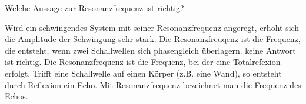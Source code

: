 \documentclass[11pt]{exam}
\begin{document}
\begin{questions}
\vspace{3mm}\question Welche Aussage zur Resonanzfrequenz ist richtig?

\begin{choices}
	\choice Wird ein schwingendes System mit seiner Resonanzfrequenz angeregt, erhöht sich die Amplitude der Schwingung sehr stark.
	\choice Die Resonanzfreuqenz ist die Frequenz, die entsteht, wenn zwei Schallwellen sich phasengleich überlagern.
	\choice keine Antwort ist richtig.
	\choice Die Resonanzfrequenz ist die Frequenz, bei der eine Totalrefexion erfolgt.
	\choice Trifft eine Schallwelle auf einen Körper (z.B. eine Wand), so entsteht durch Reflexion ein Echo. Mit Resonanzfrequenz bezeichnet man die Frequenz des Echos.
\end{choices}

\vspace{3mm}\end{questions}
\end{document}
